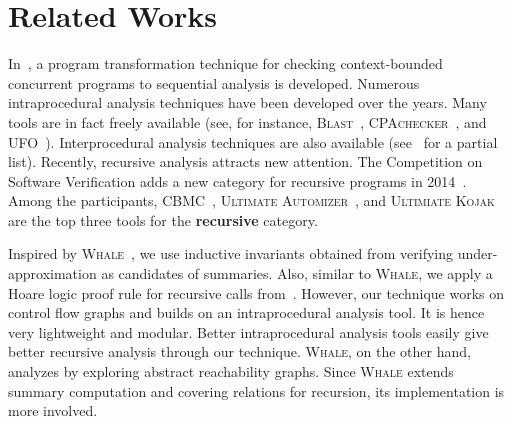 
\chapter{Related Works}\label{ch:related}

In~\cite{LalR08,LalR09}, a program transformation technique for checking context-bounded concurrent programs to sequential analysis is developed. Numerous intraprocedural analysis techniques have been developed over the years. Many tools are in fact freely available (see, for instance, \textsc{Blast}~\cite{BeyerHJM07}, \textsc{CPAchecker}~\cite{BeyerK11}, and \textsc{UFO}~\cite{AlbarghouthiLGC12}). Interprocedural analysis techniques are also available (see~\cite{RepsHS95,BallR01,CousotCFMMMR05,CuoqKKPSY12,coverity,polyspace} for a partial list). Recently, recursive analysis attracts new attention. The Competition on Software Verification adds a new category for recursive programs in 2014~\cite{svcomp14}. Among the participants, \textsc{CBMC}~\cite{ClarkeKL04}, \textsc{Ultimate Automizer}~\cite{HeizmannCDEHLNSP13}, and \textsc{Ultimiate Kojak}~\cite{ErmisNDHP14} are the top three tools for the \textbf{recursive} category.

Inspired by \textsc{Whale}~\cite{AlbarghouthiGC12}, we use inductive invariants obtained from verifying under-approximation as candidates of summaries. Also, similar to \textsc{Whale}, we apply a Hoare logic proof rule for recursive calls from~\cite{Oheimb99}. However, our technique works on control flow graphs and builds on an intraprocedural analysis tool. It is hence very lightweight and modular. Better intraprocedural analysis tools easily give better recursive analysis through our technique. \textsc{Whale}, on the other hand, analyzes by exploring abstract reachability graphs. Since \textsc{Whale} extends summary computation and covering relations for recursion, its implementation is more involved.
